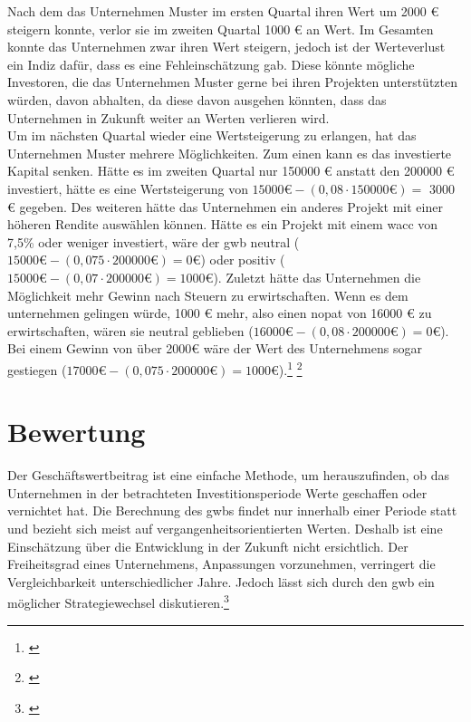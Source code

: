 Nach dem das Unternehmen Muster im ersten Quartal ihren Wert um 2000 € steigern konnte, verlor sie im zweiten Quartal 1000 € an Wert. Im Gesamten konnte das Unternehmen zwar ihren Wert steigern, jedoch ist der Werteverlust ein Indiz dafür, dass es eine Fehleinschätzung gab. Diese könnte mögliche Investoren, die das Unternehmen Muster gerne bei ihren Projekten unterstützten würden, davon abhalten, da diese davon ausgehen könnten, dass das Unternehmen in Zukunft weiter an Werten verlieren wird.\\
Um im nächsten Quartal wieder eine Wertsteigerung zu erlangen, hat das Unternehmen Muster mehrere Möglichkeiten. Zum einen kann es das investierte Kapital senken. Hätte es im zweiten Quartal nur 150000 € anstatt den 200000 € investiert, hätte es eine Wertsteigerung von $15000 \text{€} - (0,08 \cdot 150000 \text{€}) =$ 3000 € gegeben. Des weiteren hätte das Unternehmen ein anderes Projekt mit einer höheren Rendite auswählen können. Hätte es ein Projekt mit einem \ac{wacc} von 7,5\% oder weniger investiert, wäre der \ac{gwb} neutral ($15000 \text{€} - (0,075 \cdot 200000 \text{€}) = 0 \text{€}$) oder positiv ($15000 \text{€} - (0,07 \cdot 200000 \text{€}) = 1000 \text{€}$). Zuletzt hätte das Unternehmen die Möglichkeit mehr Gewinn nach Steuern zu erwirtschaften. Wenn es dem unternehmen gelingen würde, 1000 € mehr, also einen \ac{nopat} von 16000 € zu erwirtschaften, wären sie neutral geblieben ($16000 \text{€} - (0,08 \cdot 200000 \text{€}) = 0 \text{€}$). Bei einem Gewinn von über 2000€ wäre der Wert des Unternehmens sogar gestiegen ($17000 \text{€} - (0,075 \cdot 200000 \text{€}) = 1000 \text{€}$).\footnote{\cite{studyflix-eva}} \footnote{\cite{controlling-eva}}

\section{Bewertung}

Der Geschäftswertbeitrag ist eine einfache Methode, um herauszufinden, ob das Unternehmen in der betrachteten Investitionsperiode Werte geschaffen oder vernichtet hat. Die Berechnung des \ac{gwb}s findet nur innerhalb einer Periode statt und bezieht sich meist auf vergangenheitsorientierten Werten. Deshalb ist eine Einschätzung über die Entwicklung in der Zukunft nicht ersichtlich. Der Freiheitsgrad eines Unternehmens, Anpassungen vorzunehmen, verringert die Vergleichbarkeit unterschiedlicher Jahre. Jedoch lässt sich durch den \ac{gwb} ein möglicher Strategiewechsel diskutieren.\footnote{\cite{controlling-eva}}
